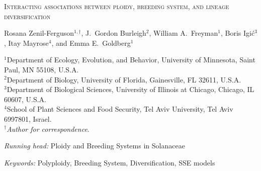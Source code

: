 \documentclass[11pt]{article}
\begin{document}

%
%
%
%
%
%
%
%
\begin{center}
    \textsc{Interacting associations between ploidy, breeding system, and lineage diversification}

\vfill

\noindent 
Rosana Zenil-Ferguson$^{1,\dagger}$,
%
J.~Gordon Burleigh$^{2}$,
%
William A.~Freyman$^{1}$,
%
Boris Igi\'c$^{3}$,
%
Itay Mayrose$^{4}$,
%
and Emma E.~Goldberg$^{1}$
%
\end{center}

%
\noindent$^{1}$Department of Ecology, Evolution, and Behavior, University of Minnesota, Saint Paul, MN 55108, U.S.A.\\
%
\noindent$^{2}$Department of Biology, University of Florida, Gainesville, FL 32611, U.S.A.\\
%
\noindent$^{3}$Department of Biological Sciences, University of Illinois at Chicago, Chicago, IL 60607, U.S.A. \\
%
\noindent$^{4}$School of Plant Sciences and Food Security, Tel Aviv University, Tel Aviv 6997801, Israel.\\
%
\noindent$^\dagger$\textit{Author for correspondence}.\\

\vfill

\noindent\textit{Running head:} 
Ploidy and Breeding Systems in Solanaceae

\noindent \textit{Keywords:} 
Polyploidy,
Breeding System,
Diversification, SSE models
\end{document}
